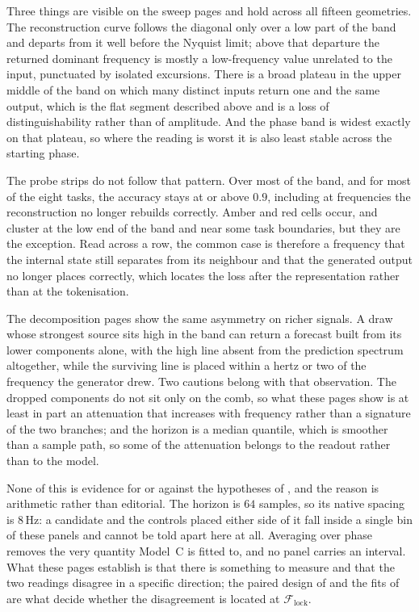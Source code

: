 Three things are visible on the sweep pages and hold across all fifteen geometries. The
reconstruction curve follows the diagonal only over a low part of the band and departs from it well
before the Nyquist limit; above that departure the returned dominant frequency is mostly a
low-frequency value unrelated to the input, punctuated by isolated excursions. There is a broad
plateau in the upper middle of the band on which many distinct inputs return one and the same
output, which is the flat segment described above and is a loss of distinguishability rather than of
amplitude. And the phase band is widest exactly on that plateau, so where the reading is worst it is
also least stable across the starting phase.

The probe strips do not follow that pattern. Over most of the band, and for most of the eight tasks,
the accuracy stays at or above $0.9$, including at frequencies the reconstruction no longer rebuilds
correctly. Amber and red cells occur, and cluster at the low end of the band and near some task
boundaries, but they are the exception. Read across a row, the common case is therefore a frequency
that the internal state still separates from its neighbour and that the generated output no longer
places correctly, which locates the loss after the representation rather than at the tokenisation.

The decomposition pages show the same asymmetry on richer signals. A draw whose strongest source
sits high in the band can return a forecast built from its lower components alone, with the high
line absent from the prediction spectrum altogether, while the surviving line is placed within a
hertz or two of the frequency the generator drew. Two cautions belong with that observation. The
dropped components do not sit only on the comb, so what these pages show is at least in part an
attenuation that increases with frequency rather than a signature of the two branches; and the
horizon is a median quantile, which is smoother than a sample path, so some of the attenuation
belongs to the readout rather than to the model.

None of this is evidence for or against the hypotheses of , and the reason is
arithmetic rather than editorial. The horizon is $64$ samples, so its native spacing is $8$\,Hz: a
candidate and the controls placed either side of it fall inside a single bin of these panels and
cannot be told apart here at all. Averaging over phase removes the very quantity Model~C is fitted
to, and no panel carries an interval. What these pages establish is that there is something to
measure and that the two readings disagree in a specific direction; the paired design of
 and the fits of  are what decide whether the disagreement is
located at $\mathcal F_{\mathrm{lock}}$.

